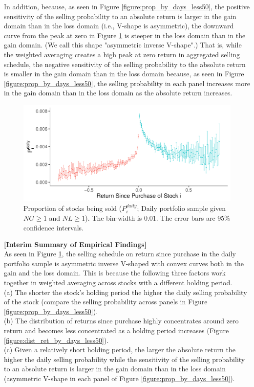 \documentclass[11pt, a4paper]{article}
\begin{document}
In addition, because, as seen  in Figure \ref{figure:prop_by_days_less50}, the positive sensitivity of the selling probability to an absolute return is larger in the gain domain than in the loss domain (i.e.,  V-shape is asymmetric), the downward curve from the peak at zero in Figure \ref{figure:prop_NG1NL1} is steeper in the loss domain than in the gain domain. (We call this shape "asymmetric inverse V-shape".) That is, while the weighted averaging creates a high peak at zero return in aggregated selling schedule, the negative sensitivity of the selling probability to the absolute return is smaller in the gain domain than in the loss domain because, as seen  in Figure \ref{figure:prop_by_days_less50}, the selling probability in each panel increases more in the gain domain than in the loss domain as the absolute return increases.

\begin{figure}[H]
	\centering
	\includegraphics[width=0.8\columnwidth]{barc_schedule_daily_NG1_NL1.pdf}
	\caption{Proportion of stocks being sold ($P^{daily}_{i}$; Daily portfolio sample given $NG\geq1$ and $NL\geq1$). The bin-width is 0.01. The error bars are 95\% confidence intervals.}
	\label{figure:prop_NG1NL1}
\end{figure}

\noindent
\textbf{[Interim Summary of Empirical Findings]}\\
As seen in Figure \ref{figure:prop_NG1NL1}, the selling schedule on return since purchase in the daily portfolio sample is asymmetric inverse V-shaped with convex curves both in the gain and the loss domain. This is because the following three factors work together in weighted averaging across stocks with a different holding period.\\

\noindent
(a) The shorter the stock's holding period the higher the daily selling probability of the stock (compare the selling probability across panels in Figure \ref{figure:prop_by_days_less50}).\\
\noindent
(b) The distribution of returns since purchase highly concentrates around zero return and becomes less concentrated as a holding period increases (Figure \ref{figure:dist_ret_by_days_less50}).\\
\noindent
(c) Given a relatively short holding period, the larger the absolute return the higher the daily selling probability while the sensitivity of the selling probability to an absolute return is larger in the gain domain than in the loss domain (asymmetric V-shape in each panel of Figure \ref{figure:prop_by_days_less50}).\\
\end{document}
